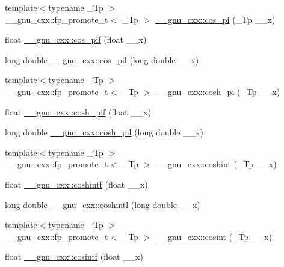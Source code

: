 \begin{DoxyCompactItemize}
\item 
{\footnotesize template$<$typename \+\_\+\+Tp $>$ }\\\+\_\+\+\_\+gnu\+\_\+cxx\+::fp\+\_\+promote\+\_\+t$<$ \+\_\+\+Tp $>$ \hyperlink{group__mathsf__gnu_gafc4698ae591b0e9e61285b0794d43ef4}{\+\_\+\+\_\+gnu\+\_\+cxx\+::cos\+\_\+pi} (\+\_\+\+Tp \+\_\+\+\_\+x)
\item 
float \hyperlink{group__mathsf__gnu_gaddcae99c1572af6fa1d79b9cfa053033}{\+\_\+\+\_\+gnu\+\_\+cxx\+::cos\+\_\+pif} (float \+\_\+\+\_\+x)
\item 
long double \hyperlink{group__mathsf__gnu_ga9b6816c0abf30fd88417d79a33cb5465}{\+\_\+\+\_\+gnu\+\_\+cxx\+::cos\+\_\+pil} (long double \+\_\+\+\_\+x)
\item 
{\footnotesize template$<$typename \+\_\+\+Tp $>$ }\\\+\_\+\+\_\+gnu\+\_\+cxx\+::fp\+\_\+promote\+\_\+t$<$ \+\_\+\+Tp $>$ \hyperlink{group__mathsf__gnu_gaf59c68a01adfdab0f22c4fb405ab2a36}{\+\_\+\+\_\+gnu\+\_\+cxx\+::cosh\+\_\+pi} (\+\_\+\+Tp \+\_\+\+\_\+x)
\item 
float \hyperlink{group__mathsf__gnu_ga79a2f5c9da96b5ea6c663d6efca24944}{\+\_\+\+\_\+gnu\+\_\+cxx\+::cosh\+\_\+pif} (float \+\_\+\+\_\+x)
\item 
long double \hyperlink{group__mathsf__gnu_gab7bf4f591dd35af2bdb88a8219f5e248}{\+\_\+\+\_\+gnu\+\_\+cxx\+::cosh\+\_\+pil} (long double \+\_\+\+\_\+x)
\item 
{\footnotesize template$<$typename \+\_\+\+Tp $>$ }\\\+\_\+\+\_\+gnu\+\_\+cxx\+::fp\+\_\+promote\+\_\+t$<$ \+\_\+\+Tp $>$ \hyperlink{group__mathsf__gnu_ga2411d513d418180285ace6650c7b7e31}{\+\_\+\+\_\+gnu\+\_\+cxx\+::coshint} (\+\_\+\+Tp \+\_\+\+\_\+x)
\item 
float \hyperlink{group__mathsf__gnu_ga1af4d48209169967a836bd97e625a128}{\+\_\+\+\_\+gnu\+\_\+cxx\+::coshintf} (float \+\_\+\+\_\+x)
\item 
long double \hyperlink{group__mathsf__gnu_ga6d24ab53fad13d421f07d9a9a509de14}{\+\_\+\+\_\+gnu\+\_\+cxx\+::coshintl} (long double \+\_\+\+\_\+x)
\item 
{\footnotesize template$<$typename \+\_\+\+Tp $>$ }\\\+\_\+\+\_\+gnu\+\_\+cxx\+::fp\+\_\+promote\+\_\+t$<$ \+\_\+\+Tp $>$ \hyperlink{group__mathsf__gnu_gafd398869cde057087e6b3428a1d13a93}{\+\_\+\+\_\+gnu\+\_\+cxx\+::cosint} (\+\_\+\+Tp \+\_\+\+\_\+x)
\item 
float \hyperlink{group__mathsf__gnu_ga87202351dc97d2c69e42bf58f911fb5a}{\+\_\+\+\_\+gnu\+\_\+cxx\+::cosintf} (float \+\_\+\+\_\+x)

\end{DoxyCompactItemize}

